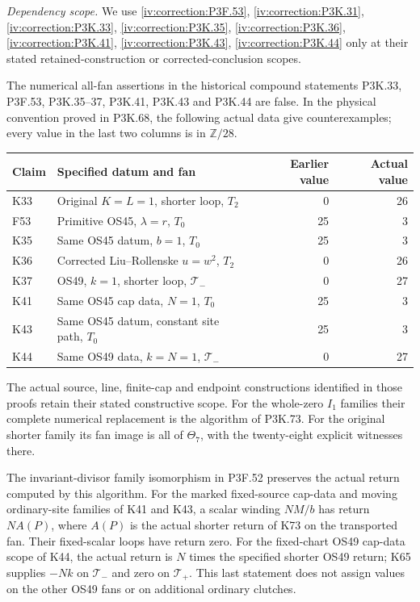 \begin{theorem}\hypertarget{tag-02VM}{}\label{night:P3K.74}

\par\noindent\textit{Dependency scope.} We use \cref{iv:correction:P3F.53}, \cref{iv:correction:P3K.31}, \cref{iv:correction:P3K.33}, \cref{iv:correction:P3K.35}, \cref{iv:correction:P3K.36}, \cref{iv:correction:P3K.41}, \cref{iv:correction:P3K.43}, \cref{iv:correction:P3K.44} only at their stated retained-construction or corrected-conclusion scopes.


The numerical all-fan assertions in the historical compound
statements P3K.33, P3F.53, P3K.35--37, P3K.41, P3K.43 and
P3K.44 are false. In the physical convention proved in P3K.68,
the following actual data give counterexamples; every value
in the last two columns is in \(\mathbb Z/28\).
\begin{center}\small
\begin{tabular}{llrr}
\toprule
Claim & Specified datum and fan & Earlier value & Actual value\\
\midrule
K33 & Original \(K=L=1\), shorter loop, \(T_2\)&0&26\\
F53 & Primitive OS45, \(\lambda=r\), \(T_0\)&25&3\\
K35 & Same OS45 datum, \(b=1\), \(T_0\)&25&3\\
K36 & Corrected Liu--Rollenske \(u=w^2\), \(T_2\)&0&26\\
K37 & OS49, \(k=1\), shorter loop, \(\mathcal T_-\)&0&27\\
K41 & Same OS45 cap data, \(N=1\), \(T_0\)&25&3\\
K43 & Same OS45 datum, constant site path, \(T_0\)&25&3\\
K44 & Same OS49 data, \(k=N=1\), \(\mathcal T_-\)&0&27\\
\bottomrule
\end{tabular}
\end{center}
The actual source, line, finite-cap and endpoint constructions
identified in those proofs retain their stated constructive
scope. For the whole-zero \(I_1\) families their complete
numerical replacement is the algorithm of P3K.73. For the
original shorter family its fan image is all of \(\Theta_7\),
with the twenty-eight explicit witnesses there.

The invariant-divisor family isomorphism in P3F.52 preserves
the actual return computed by this algorithm. For the marked
fixed-source cap-data and moving ordinary-site families of
K41 and K43, a scalar winding \(N M/b\) has return \(N A(P)\),
where \(A(P)\) is the actual shorter return of K73 on the
transported fan. Their fixed-scalar loops have return zero.
For the fixed-chart OS49 cap-data scope of K44, the actual
return is \(N\) times the specified shorter OS49 return;
K65 supplies \(-Nk\) on \(\mathcal T_-\) and zero on
\(\mathcal T_+\). This last statement does not assign values
on the other OS49 fans or on additional ordinary clutches.
\end{theorem}

